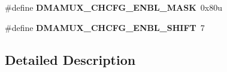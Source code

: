 \begin{DoxyCompactItemize}
\item 
\hypertarget{group___d_m_a_m_u_x___register___masks_ga311ccb0a9a00f29da44f8c41b33ba79f}{}\#define {\bfseries D\+M\+A\+M\+U\+X\+\_\+\+C\+H\+C\+F\+G\+\_\+\+E\+N\+B\+L\+\_\+\+M\+A\+S\+K}~0x80u\label{group___d_m_a_m_u_x___register___masks_ga311ccb0a9a00f29da44f8c41b33ba79f}

\item 
\hypertarget{group___d_m_a_m_u_x___register___masks_ga23d6f41370761b5c68e4d49f419aaee9}{}\#define {\bfseries D\+M\+A\+M\+U\+X\+\_\+\+C\+H\+C\+F\+G\+\_\+\+E\+N\+B\+L\+\_\+\+S\+H\+I\+F\+T}~7\label{group___d_m_a_m_u_x___register___masks_ga23d6f41370761b5c68e4d49f419aaee9}

\end{DoxyCompactItemize}


\subsection{Detailed Description}
